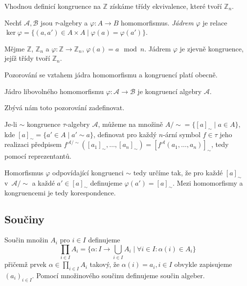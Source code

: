 \begin{definition}
    Vhodnou definicí kongruence na $\mathbb{Z}$ získáme
    třídy ekvivalence, které tvoří $\mathbb{Z}_n$.
\end{definition}

\begin{definition}
    Nechť $\mathcal{A}, \mathcal{B}$ jsou $\tau$-algebry
    a $\varphi : A \to B$ homomorfismus.
    {\em Jádrem} $\varphi$ je relace
    $\ker \varphi  = \{ (a, a') \in A \times A \mid \varphi(a) = \varphi(a') \}$.
\end{definition}

\begin{example}
    Mějme $\mathbb{Z}$, $\mathbb{Z}_n$ a
    $\varphi : \mathbb{Z} \to \mathbb{Z}_n$, $\varphi(a) = a \mod n$.
    Jádrem $\varphi$ je zjevně kongruence, jejíž třídy tvoří
    $\mathbb{Z}_n$.
\end{example}

Pozorování se vztahem jádra homomorfismu a kongruencí platí obecně.

\begin{claim}
    Jádro libovolného homomorfismu
    $\varphi : \mathcal{A} \to \mathcal{B}$
    je kongruencí algebry $\mathcal{A}$.
\end{claim}

Zbývá nám toto pozorování zadefinovat.

\begin{definition}
    Je-li $\sim$ kongruence $\tau$-algebry $\mathcal{A}$, můžeme na
    množině $A/{\sim} = \{ [a]_\sim \mid a \in A \}$,
    kde $[a]_\sim = \{ a' \in A \mid a' \sim a \}$,
    definovat pro každý $n$-ární symbol $f \in \tau$ jeho realizaci
    předpisem
    $f^{\mathcal{A}/{\sim}}([a_1]_\sim,\ldots,[a_n]_\sim)
    = [f^\mathcal{A}(a_1, \ldots, a_n)]_\sim$,
    tedy pomocí reprezentantů.
\end{definition}

Homorfismus $\varphi$ odpovídající kongruenci $\sim$ tedy určíme
tak, že pro každé $[a]_{\sim}$ v~$\mathcal{A}/{\sim}$
a každé $a' \in [a]_{\sim}$ definujeme
$\varphi(a') = [a]_{\sim}$.
Mezi homomorfismy a kongruencemi je tedy korespondence.

\subsection{Součiny}

Součin množin $A_i$ pro $i \in I$ definujeme
\[
    \prod_{i \in I} A_i = \{ \alpha : I \to \bigcup_{i \in I} A_i
    \mid \forall i \in I : \alpha(i) \in A_i \}
\]
přičemž prvek $\alpha \in \prod_{i \in I} A_i$ takový, že $\alpha(i) =
a_i, i \in I$ obvykle zapisujeme $(a_i)_{i \in I}$.
Pomocí množinového součinu definujeme součin algeber.


